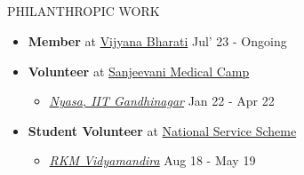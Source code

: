 \documentclass{my_cv}
\begin{document}
\begin{multicols}{2}
\section{\faGift}{PHILANTHROPIC WORK}
\begin{itemize}
    \item \textbf{Member} at \href{https://vijnanabharati.org/}{Vijyana Bharati} \hfill Jul' 23 - Ongoing
    \item \textbf{Volunteer} at \href{https://initiatives.iitgn.ac.in/nyasa/Pages/Activities/sanjeevani.html}{Sanjeevani Medical Camp} 
    \begin{itemize}
        \item \textit{\href{https://initiatives.iitgn.ac.in/nyasa/}{Nyasa, IIT Gandhinagar}} \hfill Jan 22 - Apr 22
    \end{itemize}
    \item \textbf{Student Volunteer} at \href{https://nss.gov.in/}{National Service Scheme}
    \begin{itemize}
        \item \textit{\href{https://vidyamandira.ac.in/}{RKM Vidyamandira}} \hfill Aug 18 - May 19
    \end{itemize}
\end{itemize}

\end{multicols}
\end{document}
